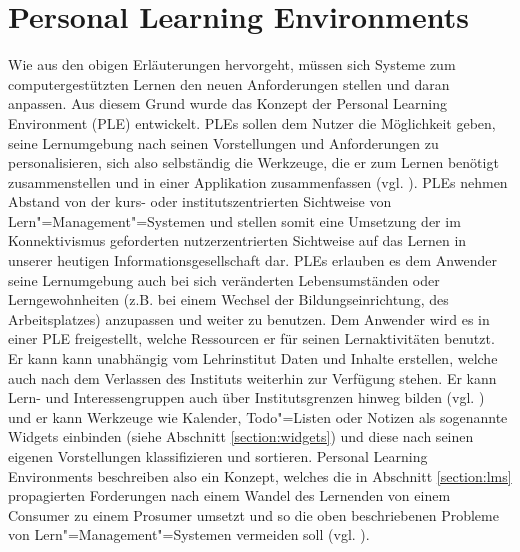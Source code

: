\section{Personal Learning Environments}\label{section:ple_intro}
Wie aus den obigen Erläuterungen hervorgeht, müssen sich Systeme zum computergestützten Lernen den neuen Anforderungen stellen und daran anpassen. Aus diesem Grund wurde das Konzept der Personal Learning Environment (PLE) entwickelt. PLEs sollen dem Nutzer die Möglichkeit geben, seine Lernumgebung nach seinen Vorstellungen und Anforderungen zu personalisieren, sich also selbständig die Werkzeuge, die er zum Lernen benötigt zusammenstellen und in einer Applikation zusammenfassen (vgl. \cite{VanHarmelen}). PLEs nehmen Abstand von der kurs- oder institutszentrierten Sichtweise von Lern"=Management"=Systemen und stellen somit eine Umsetzung der im Konnektivismus geforderten nutzerzentrierten Sichtweise auf das Lernen in unserer heutigen Informationsgesellschaft dar. PLEs erlauben es dem Anwender seine Lernumgebung auch bei sich veränderten Lebensumständen oder Lerngewohnheiten (z.B. bei einem Wechsel der Bildungseinrichtung, des Arbeitsplatzes) anzupassen und weiter zu benutzen. Dem Anwender wird es in einer PLE freigestellt, welche Ressourcen er für seinen Lernaktivitäten benutzt. Er kann kann unabhängig vom Lehrinstitut Daten und Inhalte erstellen, welche auch nach dem Verlassen des Instituts weiterhin zur Verfügung stehen. Er kann Lern- und Interessengruppen auch über Institutsgrenzen hinweg bilden (vgl. \cite{Schaffert2008a}) und er kann Werkzeuge wie Kalender, Todo"=Listen oder Notizen als sogenannte Widgets einbinden (siehe Abschnitt \ref{section:widgets}) und diese nach seinen eigenen Vorstellungen klassifizieren und sortieren. Personal Learning Environments beschreiben also ein Konzept, welches die in Abschnitt \ref{section:lms} propagierten Forderungen nach einem Wandel des Lernenden von einem Consumer zu einem Prosumer umsetzt und so die oben beschriebenen Probleme von Lern"=Management"=Systemen vermeiden soll (vgl. \cite{Attwell2007}).

